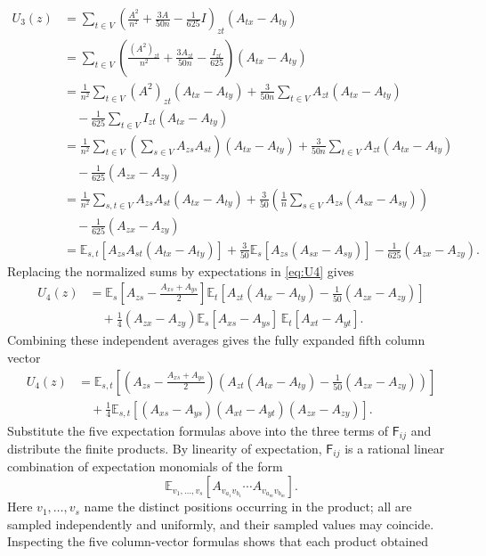 \documentclass[11pt]{article}
\newcommand{\E}{\mathbb E}
\begin{document}
\begin{align*}
U_3(z)
&=\sum_{t\in V}
\left(\frac{A^2}{n^2}+\frac{3A}{50n}-\frac1{625}I\right)_{zt}
(A_{tx}-A_{ty})\\
&=\sum_{t\in V}
\left(\frac{(A^2)_{zt}}{n^2}+\frac{3A_{zt}}{50n}-\frac{I_{zt}}{625}\right)
(A_{tx}-A_{ty})\\
&=\frac1{n^2}\sum_{t\in V}(A^2)_{zt}(A_{tx}-A_{ty})
+\frac3{50n}\sum_{t\in V}A_{zt}(A_{tx}-A_{ty})\\
&\quad-\frac1{625}\sum_{t\in V}I_{zt}(A_{tx}-A_{ty})\\
&=\frac1{n^2}\sum_{t\in V}
\left(\sum_{s\in V}A_{zs}A_{st}\right)(A_{tx}-A_{ty})
+\frac3{50n}\sum_{t\in V}A_{zt}(A_{tx}-A_{ty})\\
&\quad-\frac1{625}(A_{zx}-A_{zy})\\
&=\frac1{n^2}\sum_{s,t\in V}A_{zs}A_{st}(A_{tx}-A_{ty})
+\frac3{50}\left(\frac1n\sum_{s\in V}A_{zs}(A_{sx}-A_{sy})\right)\\
&\quad-\frac1{625}(A_{zx}-A_{zy})\\
&=\E_{s,t}[A_{zs}A_{st}(A_{tx}-A_{ty})]
+\frac3{50}\E_s[A_{zs}(A_{sx}-A_{sy})]
-\frac1{625}(A_{zx}-A_{zy}).
\end{align*}
Replacing the normalized sums by expectations in \eqref{eq:U4} gives
\begin{align*}
U_4(z)
&=\E_s\left[A_{zs}-\frac{A_{xs}+A_{ys}}2\right]
\E_t\left[A_{zt}(A_{tx}-A_{ty})-\frac1{50}(A_{zx}-A_{zy})\right]\\
&\quad+\frac14(A_{zx}-A_{zy})
\E_s[A_{xs}-A_{ys}]\,\E_t[A_{xt}-A_{yt}].
\end{align*}
Combining these independent averages gives the fully expanded fifth column vector
\begin{align*}
U_4(z)
&=\E_{s,t}\left[
\left(A_{zs}-\frac{A_{xs}+A_{ys}}2\right)
\left(A_{zt}(A_{tx}-A_{ty})-\frac1{50}(A_{zx}-A_{zy})\right)\right]\\
&\quad+\frac14\E_{s,t}\left[
(A_{xs}-A_{ys})(A_{xt}-A_{yt})(A_{zx}-A_{zy})\right].
\end{align*}
Substitute the five expectation formulas above into the three terms of
$\mathsf F_{ij}$ and distribute the finite products.
By linearity of expectation, $\mathsf F_{ij}$ is a rational linear combination
of expectation monomials of the form
\[
\E_{v_1,\ldots,v_s}
\left[A_{v_{a_1}v_{b_1}}\cdots A_{v_{a_m}v_{b_m}}\right].
\]
Here $v_1,\ldots,v_s$ name the distinct positions occurring in the product;
all are sampled independently and uniformly, and their sampled values may
coincide. Inspecting the five column-vector formulas shows that each product obtained
\end{document}

